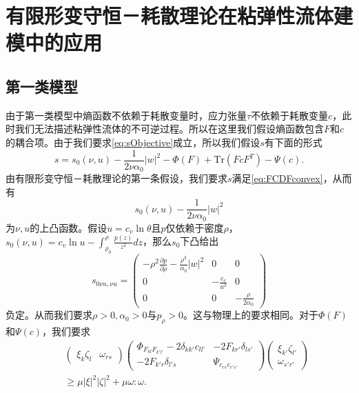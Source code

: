 \section{有限形变守恒－耗散理论在粘弹性流体建模中的应用}
\subsection{第一类模型}
由于第一类模型中熵函数不依赖于耗散变量时，应力张量$\tau$不依赖于耗散变量$c$，此时我们无法描述粘弹性流体的不可逆过程。所以在这里我们假设熵函数包含$F$和$c$的耦合项。由于我们要求\eqref{eq:sObjective}成立，所以我们假设$s$有下面的形式 
 $$s = s_0(\nu,u) - \frac{1}{2 \nu \alpha_0} |w|^2 - \Phi (F) + \mbox{Tr} (FcF^T) - \Psi(c) .$$
由有限形变守恒－耗散理论的第一条假设，我们要求$s$满足\eqref{eq:FCDFconvex}，从而有
\begin{equation*}
	s_0(\nu,u) - \frac{1}{2\nu \alpha_0}|w|^2
\end{equation*}
为$\nu,u$的上凸函数。假设$u = c_v \ln \theta$且$p$仅依赖于密度$\rho$，$s_0(\nu,u) = c_v \ln u - \int_{\rho_0}^\rho \frac{p(z)}{z^2}dz$，那么$s_0$下凸给出
\begin{equation*}
	s_{0\nu u,\nu u} = \left( \begin{array}{ccc}
		- \rho^2 \frac{\partial p}{\partial \rho} - \frac{\rho^3}{\alpha_0}|w|^2 & 0 & 0 \\
		0 & -\frac{c_v}{u^2} & 0 \\
		0 & 0 & -\frac{\rho}{2\alpha_0}
	\end{array}\right)
\end{equation*}
负定。从而我们要求$\rho>0,\alpha_0>0$与$p_\rho>0$。这与物理上的要求相同。对于$\Phi(F)$和$\Psi(c)$，我们要求
\begin{eqnarray*}
	&&\left( \begin{array}{cc}
		\xi_k \zeta_l & \omega_{rs} 
	\end{array}\right)
	\left( \begin{array}{cc}
		\Phi_{F_{kl}F_{k'l'}} - 2\delta_{kk'} c_{ll'}& -2 F_{kr'} \delta_{ls'} \\
		-2 F_{k'r} \delta_{l's} & \Psi_{c_{rs}c_{r's'}}
	\end{array}\right) 
	\left( \begin{array}{c}
		\xi_{k'}  \zeta_{l'} \\ \omega_{s'r'} 
	\end{array}\right) \\
	&&\ge \mu |\xi|^2|\zeta|^2 + \mu \omega:\omega.
\end{eqnarray*}

